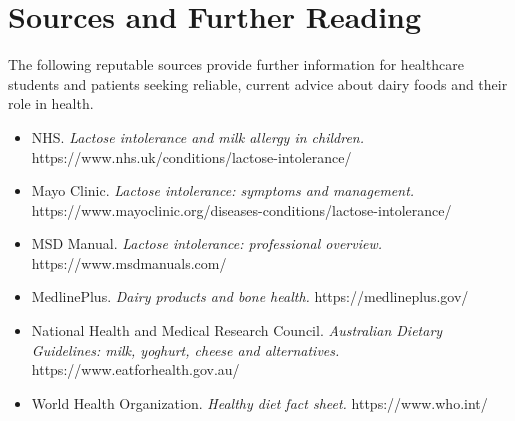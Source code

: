 \section*{Sources and Further Reading}
The following reputable sources provide further information for healthcare students and patients seeking reliable, current advice about dairy foods and their role in health.

\begin{itemize}
    \item NHS. \textit{Lactose intolerance and milk allergy in children.} https://www.nhs.uk/conditions/lactose-intolerance/
    \item Mayo Clinic. \textit{Lactose intolerance: symptoms and management.} https://www.mayoclinic.org/diseases-conditions/lactose-intolerance/
    \item MSD Manual. \textit{Lactose intolerance: professional overview.} https://www.msdmanuals.com/
    \item MedlinePlus. \textit{Dairy products and bone health.} https://medlineplus.gov/
    \item National Health and Medical Research Council. \textit{Australian Dietary Guidelines: milk, yoghurt, cheese and alternatives.} https://www.eatforhealth.gov.au/
    \item World Health Organization. \textit{Healthy diet fact sheet.} https://www.who.int/
\end{itemize}
